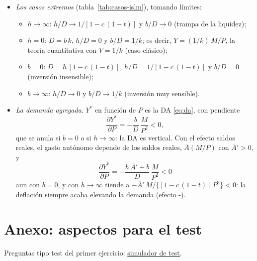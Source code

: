 \documentclass[11pt]{article}
\begin{document}
\begin{itemize}
\item \emph{Los casos extremos} (tabla~\ref{tab:casos-islm}), tomando límites:
  \begin{itemize}
  \item $h\to\infty$: $h/D\to 1/[1-c\,(1-t)]$ y $b/D\to 0$ (trampa de la liquidez);
  \item $h=0$: $D=b\,k$, $h/D=0$ y $b/D=1/k$; es decir, $Y=(1/k)\,M/P$, la teoría cuantitativa con $V=1/k$ (caso clásico);
  \item $b=0$: $D=h\,[1-c\,(1-t)]$, $h/D=1/[1-c\,(1-t)]$ y $b/D=0$ (inversión insensible);
  \item $b\to\infty$: $h/D\to 0$ y $b/D\to 1/k$ (inversión muy sensible).
  \end{itemize}
\item \emph{La demanda agregada}. $Y^*$ en función de $P$ es la DA \eqref{eq:da}, con pendiente
  \begin{equation*}
  \frac{\partial Y^*}{\partial P}=-\frac{b}{D}\,\frac{M}{P^2}<0,
  \end{equation*}
  que se anula si $b=0$ o si $h\to\infty$: la DA es vertical. Con el efecto saldos reales, el gasto autónomo depende de los saldos reales, $\overline{A}(M/P)$ con $\overline{A}'>0$, y
  \begin{equation*}
  \frac{\partial Y^*}{\partial P}=-\frac{h\,\overline{A}'+b}{D}\,\frac{M}{P^2}<0
  \end{equation*}
  aun con $b=0$, y con $h\to\infty$ tiende a $-\overline{A}'\,M/\{[1-c\,(1-t)]\,P^2\}<0$: la deflación siempre acaba elevando la demanda (efecto -).
\end{itemize}
\findemo

\section{Anexo: aspectos para el test}\label{anexo:test}

\begin{anotaciones}
Preguntas tipo test del primer ejercicio: \href{https://www.victorgutierrezmarcos.es/oposicion/temario/primer-ejercicio/test/simulador.html?tema=3.A.5}{simulador de test}.
\end{anotaciones}
\end{document}
